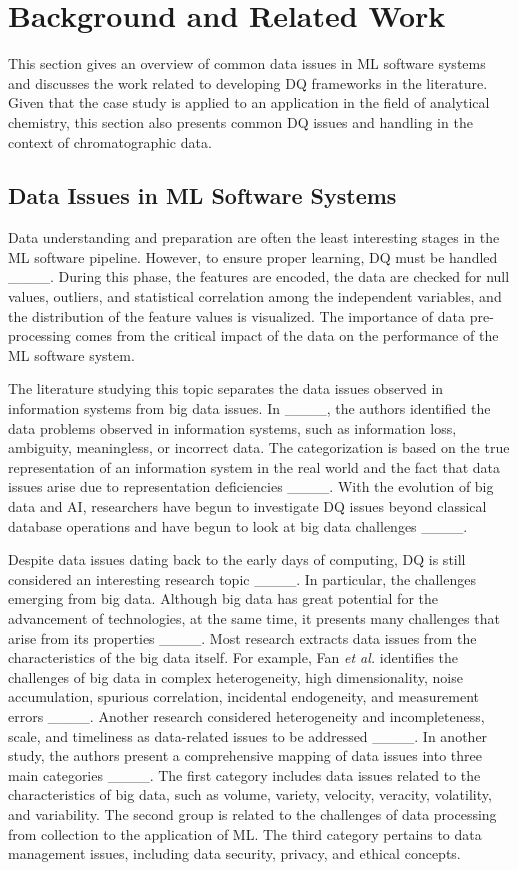\section{Background and Related Work}
\label{sec:relatedwork}
This section gives an overview of common data issues in ML software systems and discusses the work related to developing DQ frameworks in the literature. Given that the case study is applied to an application in the field of analytical chemistry, this section also presents common DQ issues and handling in the context of chromatographic data.

\subsection{Data Issues in ML Software Systems}
Data understanding and preparation are often the least interesting stages in the ML software pipeline. However, to ensure proper learning, DQ must be handled ____. During this phase, the features are encoded, the data are checked for null values, outliers, and statistical correlation among the independent variables, and the distribution of the feature values is visualized. The importance of data pre-processing comes from the critical impact of the data on the performance of the ML software system. 

The literature studying this topic separates the data issues observed in information systems from big data issues. In ____, the authors identified the data problems observed in information systems, such as information loss, ambiguity, meaningless, or incorrect data. The categorization is based on the true representation of an information system in the real world and the fact that data issues arise due to representation deficiencies ____. With the evolution of big data and AI, researchers have begun to investigate DQ issues beyond classical database operations and have begun to look at big data challenges ____.

Despite data issues dating back to the early days of computing, DQ is still considered an interesting research topic ____. In particular, the challenges emerging from big data. Although big data has great potential for the advancement of technologies, at the same time, it presents many challenges that arise from its properties ____. Most research extracts data issues from the characteristics of the big data itself. For example, Fan \emph{et al.} identifies the challenges of big data in complex heterogeneity, high dimensionality, noise accumulation, spurious correlation, incidental endogeneity, and measurement errors ____. Another research considered heterogeneity and incompleteness, scale, and timeliness as data-related issues to be addressed ____. In another study, the authors present a comprehensive mapping of data issues into three main categories ____. The first category includes data issues related to the characteristics of big data, such as volume, variety, velocity, veracity, volatility, and variability. The second group is related to the challenges of data processing from collection to the application of ML. The third category pertains to data management issues, including data security, privacy, and ethical concepts.  

